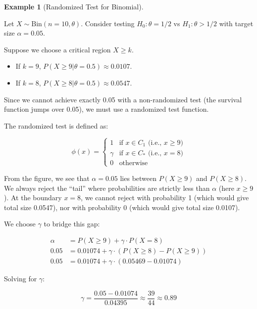 \documentclass[
  letterpaper,
  DIV=11,
  numbers=noendperiod]{scrreprt}
\providecommand{\tightlist}{%
  \setlength{\itemsep}{0pt}\setlength{\parskip}{0pt}}
\renewcommand{\[}{\begin{equation}}
\renewcommand{\]}{\end{equation}}
\theoremstyle{definition}
\theoremstyle{plain}
\theoremstyle{plain}
\theoremstyle{plain}
\theoremstyle{definition}
\newtheorem{example}{Example}[chapter]
\theoremstyle{plain}
\theoremstyle{remark}
\begin{document}
\begin{example}[Randomized Test for
Binomial]\protect\hypertarget{exm-randomized-test}{}\label{exm-randomized-test}

Let \(X \sim \text{Bin}(n=10, \theta)\). Consider testing
\(H_0: \theta = 1/2\) vs \(H_1: \theta > 1/2\) with target size
\(\alpha = 0.05\).

Suppose we choose a critical region \(X \ge k\).

\begin{itemize}
\tightlist
\item
  If \(k=9\), \(P(X \ge 9 | \theta=0.5) \approx 0.0107\).
\item
  If \(k=8\), \(P(X \ge 8 | \theta=0.5) \approx 0.0547\).
\end{itemize}

Since we cannot achieve exactly 0.05 with a non-randomized test (the
survival function jumps over 0.05), we must use a randomized test
function.

The randomized test is defined as:

\[
\phi(x) = \begin{cases} 
1 & \text{if } x \in C_1 \text{ (i.e., } x \ge 9) \\
\gamma & \text{if } x \in C_* \text{ (i.e., } x = 8) \\
0 & \text{otherwise}
\end{cases}
\]

From the figure, we see that \(\alpha = 0.05\) lies between
\(P(X \ge 9)\) and \(P(X \ge 8)\). We always reject the ``tail'' where
probabilities are strictly less than \(\alpha\) (here \(x \ge 9\)). At
the boundary \(x=8\), we cannot reject with probability 1 (which would
give total size 0.0547), nor with probability 0 (which would give total
size 0.0107).

We choose \(\gamma\) to bridge this gap:

\[
\begin{aligned}
\alpha &= P(X \ge 9) + \gamma \cdot P(X = 8) \\
0.05 &= 0.01074 + \gamma \cdot (P(X \ge 8) - P(X \ge 9)) \\
0.05 &= 0.01074 + \gamma \cdot (0.05469 - 0.01074)
\end{aligned}
\]

Solving for \(\gamma\):

\[
\gamma = \frac{0.05 - 0.01074}{0.04395} \approx \frac{39}{44} \approx 0.89
\]

\end{example}
\end{document}
